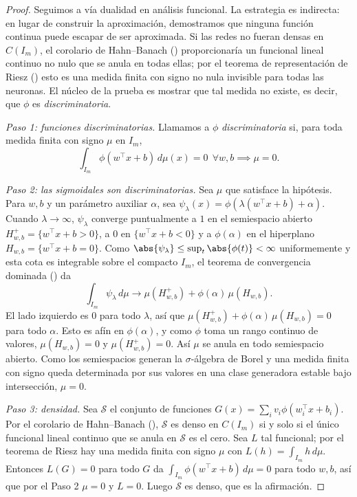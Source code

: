 \begin{proof}
Seguimos a \citet{cybenko1989} v\'ia dualidad en an\'alisis funcional. La
estrategia es indirecta: en lugar de construir la aproximaci\'on, demostramos que
ninguna funci\'on continua puede escapar de ser aproximada. Si las redes no fueran
densas en $C(I_m)$, el corolario de Hahn--Banach ()
proporcionar\'ia un funcional lineal continuo no nulo que se anula en todas ellas;
por el teorema de representaci\'on de Riesz () esto es una medida
finita con signo no nula invisible para todas las neuronas. El n\'ucleo de la
prueba es mostrar que tal medida no existe, es decir, que $\phi$ es
\emph{discriminatoria}.

\emph{Paso 1: funciones discriminatorias.} Llamamos a $\phi$
\emph{discriminatoria} si, para toda medida finita con signo $\mu$ en $I_m$,
\[
  \int_{I_m} \phi(w^\top x + b)\, d\mu(x) = 0 \ \ \forall w, b
  \implies \mu = 0.
\]

\emph{Paso 2: las sigmoidales son discriminatorias.} Sea $\mu$ que satisface la
hip\'otesis. Para $w, b$ y un par\'ametro auxiliar $\alpha$, sea
$\psi_\lambda(x) = \phi(\lambda(w^\top x + b) + \alpha)$. Cuando $\lambda \to
\infty$, $\psi_\lambda$ converge puntualmente a $1$ en el semiespacio abierto
$H^+_{w,b} = \{w^\top x + b > 0\}$, a $0$ en $\{w^\top x + b < 0\}$ y a
$\phi(\alpha)$ en el hiperplano $H_{w,b} = \{w^\top x + b = 0\}$. Como
$\abs{\psi_\lambda} \le \sup_t \abs{\phi(t)} < \infty$ uniformemente y esta cota es
integrable sobre el compacto $I_m$, el teorema de convergencia dominada
() da
\[
  \int_{I_m}\psi_\lambda\, d\mu \to \mu(H^+_{w,b}) + \phi(\alpha)\,\mu(H_{w,b}).
\]
El lado izquierdo es $0$ para todo $\lambda$, as\'i que $\mu(H^+_{w,b}) +
\phi(\alpha)\,\mu(H_{w,b}) = 0$ para todo $\alpha$. Esto es af\'in en
$\phi(\alpha)$, y como $\phi$ toma un rango continuo de valores, $\mu(H_{w,b}) = 0$
y $\mu(H^+_{w,b}) = 0$. As\'i $\mu$ se anula en todo semiespacio abierto. Como los
semiespacios generan la $\sigma$-\'algebra de Borel y una medida finita con signo
queda determinada por sus valores en una clase generadora estable bajo
intersecci\'on, $\mu = 0$.

\emph{Paso 3: densidad.} Sea $\mathcal{S}$ el conjunto de funciones $G(x) =
\sum_i v_i \phi(w_i^\top x + b_i)$. Por el corolario de Hahn--Banach
(), $\mathcal{S}$ es denso en $C(I_m)$ si y solo si el \'unico
funcional lineal continuo que se anula en $\mathcal{S}$ es el cero. Sea $L$ tal
funcional; por el teorema de Riesz hay una medida finita con signo $\mu$ con
$L(h) = \int_{I_m} h\, d\mu$. Entonces $L(G) = 0$ para todo $G$ da
$\int_{I_m}\phi(w^\top x + b)\, d\mu = 0$ para todo $w, b$, as\'i que por el Paso 2
$\mu = 0$ y $L = 0$. Luego $\mathcal{S}$ es denso, que es la afirmaci\'on.
\end{proof}

